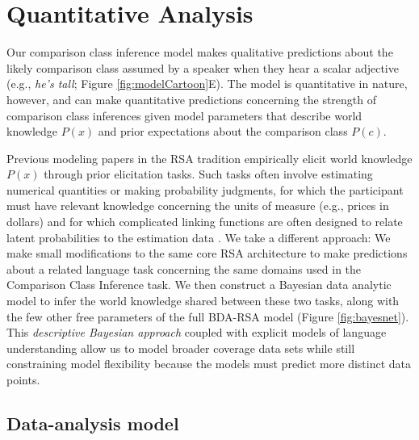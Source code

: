 \documentclass[doc]{apa6}
\begin{document}

\section{Quantitative Analysis}

Our comparison class inference model makes qualitative predictions about the likely comparison class assumed by a speaker when they hear a scalar adjective (e.g., \emph{he's tall}; Figure \ref{fig:modelCartoon}E). 
The model is quantitative in nature, however, and can make quantitative predictions concerning the strength of comparison class inferences given model parameters that describe world knowledge $P(x)$ and prior expectations about the comparison class $P(c)$.

Previous modeling papers in the RSA tradition empirically elicit world knowledge $P(x)$ through prior elicitation tasks.
Such tasks often involve estimating numerical quantities or making probability judgments, for which the participant must have relevant knowledge concerning the units of measure (e.g., prices in dollars) and for which complicated linking functions are often designed to relate latent probabilities to the estimation data \cite{Franke2016}. 
We take a different approach: We make small modifications to the same core RSA architecture to make predictions about a related language task concerning the same domains used in the Comparison Class Inference task. 
We then construct a Bayesian data analytic model to infer the world knowledge shared between these two tasks, along with the few other free parameters of the full BDA-RSA model (Figure \ref{fig:bayesnet}). 
This \emph{descriptive Bayesian approach} \cite{tauber2017} coupled with explicit models of language understanding allow us to model broader coverage data sets while still constraining model flexibility because the models must predict more distinct data points. 

\subsection{Data-analysis model}
\end{document}
